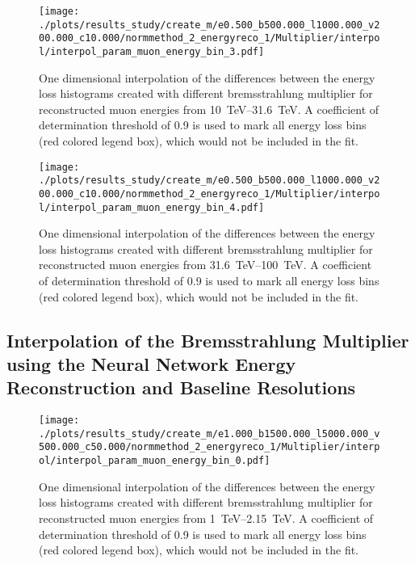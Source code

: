 \begin{figure}[H]
    \centering
    \texttt{[image: ./plots/results\_study/create\_m/e0.500\_b500.000\_l1000.000\_v200.000\_c10.000/normmethod\_2\_energyreco\_1/Multiplier/interpol/interpol\_param\_muon\_energy\_bin\_3.pdf]}
    \caption{One dimensional interpolation of the differences between the energy loss histograms created with different bremsstrahlung multiplier for reconstructed muon energies from \SIrange{10}{31.6}{TeV}. A coefficient of determination threshold of \num{0.9} is used to mark all energy loss bins (red colored legend box), which would not be included in the fit.}
    \label{fig:study_1d_interpol_mu3_nn_high}
\end{figure}

\begin{figure}[H]
    \centering
    \texttt{[image: ./plots/results\_study/create\_m/e0.500\_b500.000\_l1000.000\_v200.000\_c10.000/normmethod\_2\_energyreco\_1/Multiplier/interpol/interpol\_param\_muon\_energy\_bin\_4.pdf]}
    \caption{One dimensional interpolation of the differences between the energy loss histograms created with different bremsstrahlung multiplier for reconstructed muon energies from \SIrange{31.6}{100}{TeV}. A coefficient of determination threshold of \num{0.9} is used to mark all energy loss bins (red colored legend box), which would not be included in the fit.}
    \label{fig:study_1d_interpol_mu4_nn_high}
\end{figure}

%

\subsection*{Interpolation of the Bremsstrahlung Multiplier using the Neural Network Energy Reconstruction and Baseline Resolutions}

\begin{figure}[H]
    \centering
    \texttt{[image: ./plots/results\_study/create\_m/e1.000\_b1500.000\_l5000.000\_v500.000\_c50.000/normmethod\_2\_energyreco\_1/Multiplier/interpol/interpol\_param\_muon\_energy\_bin\_0.pdf]}
    \caption{One dimensional interpolation of the differences between the energy loss histograms created with different bremsstrahlung multiplier for reconstructed muon energies from \SIrange{1}{2.15}{TeV}. A coefficient of determination threshold of \num{0.9} is used to mark all energy loss bins (red colored legend box), which would not be included in the fit.}
    \label{fig:study_1d_interpol_mu0_nn_base}
\end{figure}


